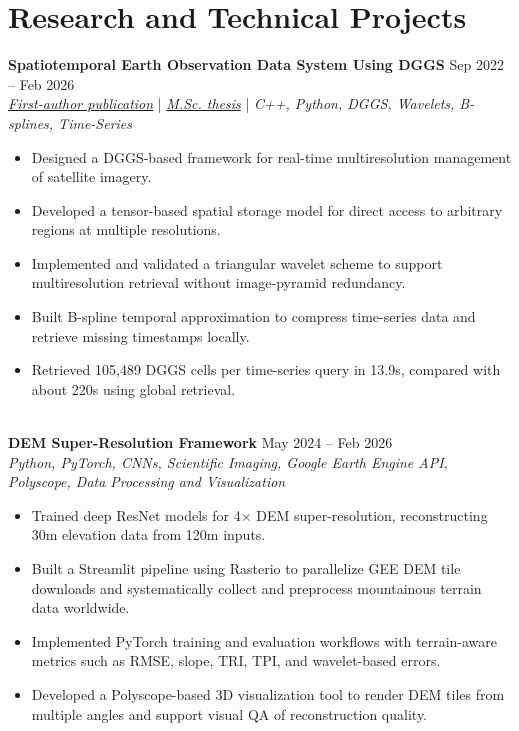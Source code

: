 \documentclass[a4paper,10pt]{article}
\begin{document}

\section*{Research and Technical Projects}

\noindent
\textbf{Spatiotemporal Earth Observation Data System Using DGGS} \hfill Sep 2022 -- Feb 2026 \\
\textit{\href{https://doi.org/10.3390/rs17040570}{First-author publication}} | \textit{\href{https://ucalgary.scholaris.ca/items/114b394b-e516-4732-bd3a-45dd6160d480}{M.Sc. thesis}} | \textit{C++, Python, DGGS, Wavelets, B-splines, Time-Series}
\begin{itemize}[leftmargin=0.25in]
    \item Designed a DGGS-based framework for real-time multiresolution management of satellite imagery.
    \item Developed a tensor-based spatial storage model for direct access to arbitrary regions at multiple resolutions.
    \item Implemented and validated a triangular wavelet scheme to support multiresolution retrieval without image-pyramid redundancy.
    \item Built B-spline temporal approximation to compress time-series data and retrieve missing timestamps locally.
    \item Retrieved 105,489 DGGS cells per time-series query in 13.9s, compared with about 220s using global retrieval.
\end{itemize}

\noindent \\
\textbf{DEM Super-Resolution Framework} \hfill May 2024 -- Feb 2026 \\
\textit{Python, PyTorch, CNNs, Scientific Imaging, Google Earth Engine API, Polyscope, Data Processing and Visualization}
\begin{itemize}[leftmargin=0.25in]
    \item Trained deep ResNet models for 4$\times$ DEM super-resolution, reconstructing 30m elevation data from 120m inputs.
    \item Built a Streamlit pipeline using Rasterio to parallelize GEE DEM tile downloads and systematically collect and preprocess mountainous terrain data worldwide.
    \item Implemented PyTorch training and evaluation workflows with terrain-aware metrics such as RMSE, slope, TRI, TPI, and wavelet-based errors.
    \item Developed a Polyscope-based 3D visualization tool to render DEM tiles from multiple angles and support visual QA of reconstruction quality.
\end{itemize}
\end{document}
